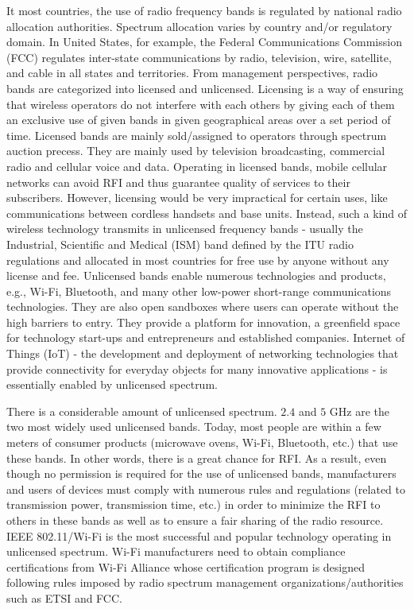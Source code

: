 It most countries, the use of radio frequency bands is regulated by national radio allocation authorities. Spectrum allocation varies by country and/or regulatory domain. In United States, for example, the Federal Communications Commission (FCC) regulates inter-state communications by radio, television, wire, satellite, and cable in all states and territories. From management perspectives, radio bands are categorized into licensed and unlicensed. Licensing is a way of ensuring that wireless operators do not interfere with each others by giving each of them an exclusive use of given bands in given geographical areas over a set period of time. Licensed bands are mainly sold/assigned to operators through spectrum auction precess. They are mainly used by television broadcasting, commercial radio and cellular voice and data. Operating in licensed bands, mobile cellular networks can avoid RFI and thus guarantee quality of services to their subscribers. However, licensing would be very impractical for certain uses, like communications between cordless handsets and base units. Instead, such a kind of wireless technology transmits in unlicensed frequency bands - usually the Industrial, Scientific and Medical (ISM) band defined by the ITU radio regulations and allocated in most countries for free use by anyone without any license and fee. Unlicensed bands enable numerous technologies and products, e.g., Wi-Fi, Bluetooth, and many other low-power short-range communications technologies. They are also open sandboxes where users can operate without the high barriers to entry. They provide a platform for innovation, a greenfield space for technology start-ups and entrepreneurs and established companies. Internet of Things (IoT) - the development and deployment of networking technologies that provide connectivity for everyday objects for many innovative applications - is essentially enabled by unlicensed spectrum.

There is a considerable amount of unlicensed spectrum. $2.4$ and $5$ GHz are the two most widely used unlicensed bands. Today, most people are within a few meters of consumer products (microwave ovens, Wi-Fi, Bluetooth, etc.) that use these bands. In other words, there is a great chance for RFI. As a result, even though no permission is required for the use of unlicensed bands, manufacturers and users of devices must comply with numerous rules and regulations (related to transmission power, transmission time, etc.) in order to minimize the RFI to others in these bands as well as to ensure a fair sharing of the radio resource. IEEE 802.11/Wi-Fi is the most successful and popular technology operating in unlicensed spectrum. Wi-Fi manufacturers need to obtain compliance certifications from Wi-Fi Alliance whose certification program is designed following rules imposed by radio spectrum management organizations/authorities such as ETSI and FCC. 

